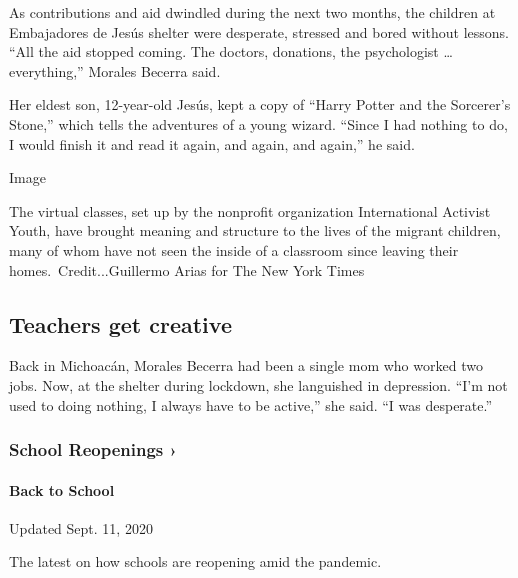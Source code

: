 As contributions and aid dwindled during the next two months, the
children at Embajadores de Jesús shelter were desperate, stressed and
bored without lessons. ``All the aid stopped coming. The doctors,
donations, the psychologist \ldots{} everything,'' Morales Becerra said.

Her eldest son, 12-year-old Jesús, kept a copy of ``Harry Potter and the
Sorcerer's Stone,'' which tells the adventures of a young wizard.
``Since I had nothing to do, I would finish it and read it again, and
again, and again,'' he said.

Image

The virtual classes, set up by the nonprofit organization International
Activist Youth, have brought meaning and structure to the lives of the
migrant children, many of whom have not seen the inside of a classroom
since leaving their homes.~Credit...Guillermo Arias for The New York
Times

\hypertarget{teachers-get-creative}{%
\subsection{Teachers get creative}\label{teachers-get-creative}}

Back in Michoacán, Morales Becerra had been a single mom who worked two
jobs. Now, at the shelter during lockdown, she languished in depression.
``I'm not used to doing nothing, I always have to be active,'' she said.
``I was desperate.''

\href{https://www.nytimes3xbfgragh.onion/spotlight/schools-reopening?action=click\&pgtype=Article\&state=default\&region=MAIN_CONTENT_3\&context=storylines_keepup}{}

\hypertarget{school-reopenings-}{%
\subsubsection{School Reopenings ›}\label{school-reopenings-}}

\hypertarget{back-to-school}{%
\paragraph{Back to School}\label{back-to-school}}

Updated Sept. 11, 2020

The latest on how schools are reopening amid the pandemic.

